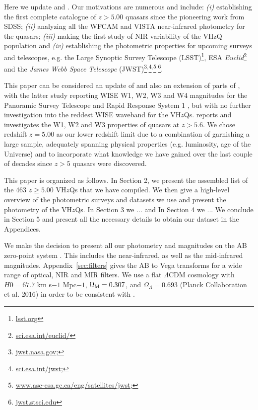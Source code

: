 \documentclass[usenatbib]{mnras}
\begin{document}
Here we update \citet{Jiang2010} and \citet{Blain2013} \citep[along
with Table 8 of][]{Banados2016}. Our motivations are numerous and
include: {\it (i)} establishing the first complete catalogue of
$z>5.00$ quasars since the pioneering work from SDSS; {\it (ii)}
analyzing all the WFCAM and VISTA near-infrared photometry for the
quasars; {\it (iii)} making the first study of NIR variability of the
VHzQ population and {\it (iv)} establishing the photometric properties
for upcoming surveys and telescopes, e.g. the Large Synoptic Survey
Telescope (LSST)\footnote{\href{https://www.lsst.org}{{lsst.org}}},
ESA {\it
Euclid}\footnote{\href{https://sci.esa.int/euclid/}{sci.esa.int/euclid/}}
and the {\it James Webb Space Telescope}
(JWST)\footnote{\href{https://www.jwst.nasa.gov/}{jwst.nasa.gov};}$^,$\footnote{\href{https://sci.esa.int/jwst/}{sci.esa.int/jwst};}$^,$\footnote{\href{https://www.asc-csa.gc.ca/eng/satellites/jwst/}{www.asc-csa.gc.ca/eng/satellites/jwst};}$^,$\footnote{\href{https://jwst.stsci.edu/}{jwst.stsci.edu}}.

This paper can be considered an update of \citet{Blain2013} and also
an extension of parts of \citet{Banados2016}, with the latter study
reporting WISE W1, W2, W3 and W4 magnitudes for the Panoramic Survey
Telescope and Rapid Response System 1 \citep[Pan-STARRS1,
PS1;][]{Kaiser2002, Kaiser2010}, but with no further investigation
into the reddest WISE waveband for the VH$z$Qs.  \citet{Banados2016}
reports and investigates the W1, W2 and W3 properties of quasars at $z
> 5.6$. We chose redshift $z=5.00$ as our lower redshift limit due to
a combination of garnishing a large sample, adequately spanning
physical properties (e.g. luminosity, age of the Universe) and to
incorporate what knowledge we have gained over the last couple of
decades since $z>5$ quasars were discovered.

This paper is organized as follows.  In Section 2, we present the
assembled list of the 463 $z\geq5.00$ VH$z$Qs that we have
compiled. We then give a high-level overview of the photometric
surveys and datasets we use and present the photometry of the VH$z$Qs.
In Section 3 we ... and In Section 4 we ... We conclude in Section 5 
and present all the necessary details to obtain our dataset in the 
Appendices. 

We make the decision to present all our photometry and magnitudes on
the AB zero-point system \citep{Oke_Gunn1983, Fukugita1996}.  This
includes the near-infrared, as well as the mid-infrared magnitudes.
Appendix~\ref{sec:filters} gives the AB to Vega transforms for a wide
range of optical, NIR and MIR filters. We use a flat $\Lambda$CDM
cosmology with $H0 = 67.7$ km s$-1$ Mpc$−1$, $\Omega_{\rm M} = 0.307$,
and $\Omega_{\Lambda} = 0.693$ (Planck Collaboration et al. 2016) in
order to be consistent with \citet{Banados2016}.
\end{document}
